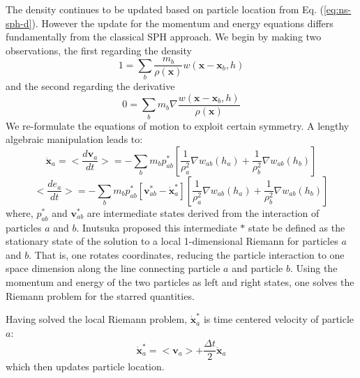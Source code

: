 \documentclass[review]{elsarticle}
\begin{document}
The density continues to be updated based on particle location from Eq. (\ref{eq:ns-sph-d}). However the update for the momentum and energy equations differs fundamentally from the classical SPH approach. We begin by making two observations, the first regarding the density
\begin{equation}
1=\sum_{b} \frac{m_{b}}{\rho(\textbf{x})}w(\textbf{x} - \textbf{x}_{b}, h)
\label{eq:GSPH-basic1}
\end{equation}
and the second regarding the derivative 
\begin{equation}
0=\sum_{b} m_{b} \nabla \frac{w(\textbf{x} - \textbf{x}_{b}, h)}{\rho(\textbf{x})}
\label{eq:GSPH-basic2}
\end{equation}
We re-formulate the equations of motion to exploit certain symmetry. A lengthy algebraic manipulation \citep{inutsuka2002reformulation,iwasaki2011smoothed} leads to:
\begin{equation}
\ddot{\textbf{x}}_{a} = <\dfrac{d \textbf{v}_{a}}{dt}>= -\sum_{b} m_{b} p_{a b}^{\ast} \left[\frac{1}{\rho_{a}^2} \nabla w_{a b}(h_{a}) + \frac{1}{\rho_{b}^2} \nabla w_{a b}(h_{b}) \right]
\label{eq:gov-gsph-v-simple-form}
\end{equation}
\begin{equation}
<\dfrac{d e_{a}}{dt}>= - \sum_{b} m_{b} p_{a b}^{\ast} [\textbf{v}_{a b}^{\ast} - \dot{\textbf{x}}_{a}^{\ast}] \left[\frac{1}{\rho_{a}^2} \nabla w_{a b}(h_{a}) + \frac{1}{\rho_{b}^2} \nabla w_{a b}(h_{b}) \right]
\label{eq:gov-gsph-e-simple-form}
\end{equation}
where, $p_{a b}^{\ast}$ and $\textbf{v}_{a b}^{\ast}$ are intermediate states derived from the interaction of particles $a$ and $b$. Inutsuka proposed this intermediate $\ast$ state be defined as the stationary state of the solution to a local 1-dimensional Riemann for particles $a$ and $b$.  That is, one rotates coordinates, reducing the particle interaction to one space dimension along the line connecting particle $a$ and particle $b$. Using the momentum and energy of the two particles as left and right states, one solves the Riemann problem for the starred quantities.

Having solved the local Riemann problem, 
$\dot{\textbf{x}}_{a}^{\ast}$ is time centered velocity of particle $a$:
\begin{equation}
\dot{\textbf{x}}_{a}^{\ast} = <\textbf{v}_{a}> + \frac{\Delta t}{2} \ddot{\textbf{x}}_{a}
\end{equation}
which then updates particle location.
\end{document}
